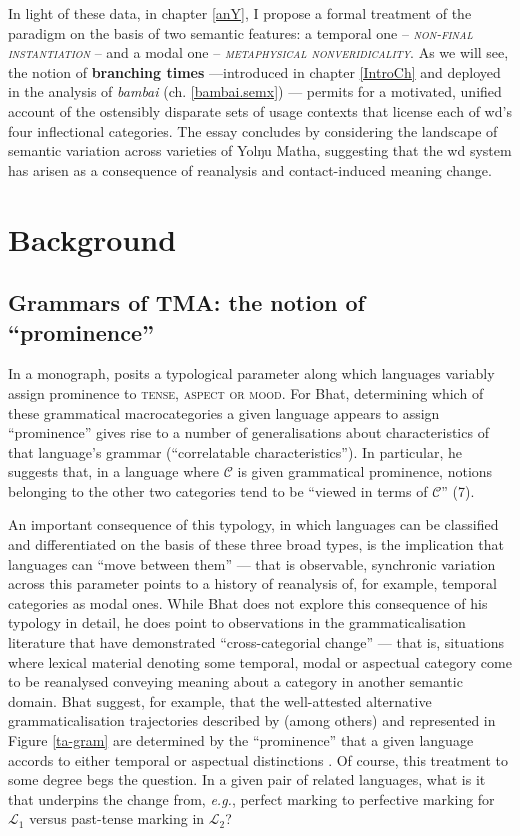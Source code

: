 In light of these data, in chapter \ref{anY}, I propose a formal treatment of the paradigm on the basis of two semantic features: a temporal one -- \textsc{\textit{non-final instantiation}} -- and a modal one -- \textsc{\textit{metaphysical nonveridicality}}. As we will see, the notion of \textbf{branching times} ---introduced in chapter \ref{IntroCh} and deployed in the analysis of \textit{bambai} (ch. \ref{bambai.semx}) --- permits for a motivated, unified account of the ostensibly disparate sets of usage contexts that license each of \gls{wd}'s four inflectional categories. The essay concludes by considering the landscape of semantic variation across varieties of Yolŋu Matha, suggesting that the \gls{wd} system has arisen as a consequence of reanalysis and contact-induced meaning change.

\chapter{Background}\label{yol-bkgd}

\section{Grammars of TMA: the notion of ``prominence''}

In a \citeyear{Bhat1999} monograph, \citeauthor{Bhat1999} posits a typological parameter along which languages variably assign prominence to \textsc{tense, aspect \textup{or} mood}. For Bhat, determining which of these grammatical macrocategories a given language appears to assign ``prominence'' gives rise to a number of generalisations about characteristics of that language's grammar (``correlatable characteristics''). In particular, he suggests that, in a language where $ \mathcal C $ is given grammatical prominence, notions belonging to the other two categories tend to be ``viewed in terms of $ \mathcal C $'' (7).


An important consequence of this typology, in which languages can be classified and differentiated on the basis of these three broad types, is the implication that languages can ``move between them'' --- that is observable, synchronic variation across this parameter points to a history of reanalysis of, for example, temporal categories as modal ones. While Bhat does not explore this consequence of his typology in detail, he does point to observations in the grammaticalisation literature that have demonstrated ``cross-categorial change'' --- that is, situations where lexical material denoting some temporal, modal or aspectual category come to be reanalysed conveying meaning about a category in another semantic domain. Bhat suggest, for example, that the well-attested alternative grammaticalisation trajectories described by \cite{Bybee1994} (among others) and represented in Figure \ref{ta-gram} are determined by the ``prominence'' that a given language accords to either temporal or aspectual distinctions \citeyearpar[182]{Bhat1999}. Of course, this treatment to some degree begs the question. In a given pair of related languages, what is it that underpins the change from, \textit{e.g.}, perfect marking to perfective marking for $ \mathcal L_1 $ versus past-tense marking in $ \mathcal{L}_2 $?

